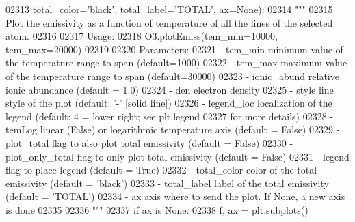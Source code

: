 \begin{DoxyCode}
\hypertarget{classpyneb_1_1core_1_1pynebcore_1_1_atom_l02313}{}\hyperlink{classpyneb_1_1core_1_1pynebcore_1_1_atom_adc2de658da17347204f430aff728650b}{02313}                   total\_color=\textcolor{stringliteral}{'black'}, total\_label=\textcolor{stringliteral}{'TOTAL'}, ax=\textcolor{keywordtype}{None}):
02314         \textcolor{stringliteral}{""" }
02315 \textcolor{stringliteral}{        Plot the emissivity as a function of temperature of all the lines of the selected atom.  }
02316 \textcolor{stringliteral}{}
02317 \textcolor{stringliteral}{        Usage: }
02318 \textcolor{stringliteral}{            O3.plotEmiss(tem\_min=10000, tem\_max=20000)}
02319 \textcolor{stringliteral}{        }
02320 \textcolor{stringliteral}{        Parameters:}
02321 \textcolor{stringliteral}{            - tem\_min         minimum value of the temperature range to span (default=1000)}
02322 \textcolor{stringliteral}{            - tem\_max         maximum value of the temperature range to span (default=30000)}
02323 \textcolor{stringliteral}{            - ionic\_abund     relative ionic abundance (default = 1.0)}
02324 \textcolor{stringliteral}{            - den             electron density}
02325 \textcolor{stringliteral}{            - style           line style of the plot (default: '-' [solid line])}
02326 \textcolor{stringliteral}{            - legend\_loc      localization of the legend (default: 4 = lower right; see plt.legend }
02327 \textcolor{stringliteral}{                                for more details)}
02328 \textcolor{stringliteral}{            - temLog          linear (False) or logarithmic temperature axis (default = False)}
02329 \textcolor{stringliteral}{            - plot\_total      flag to also plot total emissivity (default = False)}
02330 \textcolor{stringliteral}{            - plot\_only\_total flag to only plot total emissivity (default = False)}
02331 \textcolor{stringliteral}{            - legend          flag to place legend (default = True)}
02332 \textcolor{stringliteral}{            - total\_color     color of the total emissivity (default = 'black')}
02333 \textcolor{stringliteral}{            - total\_label     label of the total emissivity (default = 'TOTAL')}
02334 \textcolor{stringliteral}{            - ax              axis where to send the plot. If None, a new axis is done}
02335 \textcolor{stringliteral}{}
02336 \textcolor{stringliteral}{        """}
02337         \textcolor{keywordflow}{if} ax \textcolor{keywordflow}{is} \textcolor{keywordtype}{None}:
02338             f, ax = plt.subplots()

\end{DoxyCode}
